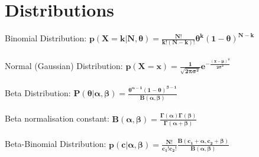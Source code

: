 \documentclass{article}
\begin{document}
\section{Distributions}
Binomial Distribution: $\mathbf{p(X = k|N,\theta) = \frac{N!}{k!(N-k)!}\theta^k(1-\theta)^{N-k}}$\\\\
Normal (Gaussian) Distribution: $\mathbf{p(X = x) = \frac{1}{\sqrt{2\pi \sigma ^2}} e^{-\frac{(x-\mu )^2}{2\sigma ^2}}}$\\\\
Beta Distribution: $\mathbf{P(\theta |\alpha ,\beta ) = \frac{\theta^{\alpha - 1}(1-\theta )^{\beta - 1}}{B(\alpha , \beta)}}$\\\\
Beta normalisation constant: $\mathbf{B(\alpha,\beta) = \frac{\Gamma(\alpha)\Gamma(\beta)}{\Gamma(\alpha+\beta)}}$\\\\
Beta-Binomial Distribution: $\mathbf{p(c|\alpha,\beta) = \frac{N!}{c_1!c_2!}\frac{B(c_1 + \alpha, c_2 + \beta)}{B(\alpha,\beta)}}$
\end{document}
